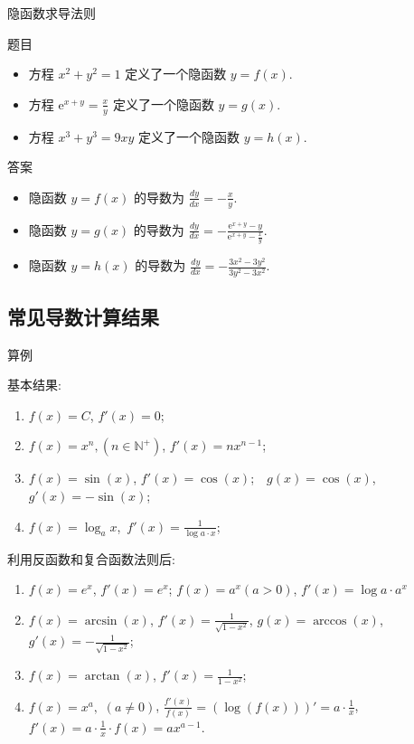 \documentclass[
10pt,
aspectratio=43,
]{beamer}
\begin{document}
\begin{frame}{隐函数求导法则}
	\begin{block}{题目}
		\begin{itemize}
			\item 方程 $x^2 + y^2 = 1$ 定义了一个隐函数 $y = f(x)$.
			\item 方程 $\displaystyle\mathrm{e}^{x+y}=\frac{x}{y}$ 定义了一个隐函数 $y = g(x)$.
			\item 方程 $x^3 + y^3 = 9xy$ 定义了一个隐函数 $y = h(x)$.
		\end{itemize}
	\end{block}

	\pause

	\begin{exampleblock}{答案}
		\begin{itemize}
			\item 隐函数 $y = f(x)$ 的导数为 $\displaystyle\frac{{dy}}{{dx}} = -\frac{{x}}{{y}}.$
			\item 隐函数 $y = g(x)$ 的导数为 $\displaystyle\frac{{dy}}{{dx}} = -\frac{{\mathrm{e}^{x+y}-y}}{{\mathrm{e}^{x+y}-\frac{x}{y}}}.$
			\item 隐函数 $y = h(x)$ 的导数为 $\displaystyle\frac{{dy}}{{dx}} = -\frac{{3x^2 - 3y^2}}{{3y^2 - 3x^2}}.$
		\end{itemize}
	\end{exampleblock}
\end{frame}

\subsection{常见导数计算结果}
\begin{frame}{算例}
	\begin{block}{}
		{\small 基本结果:
			\begin{enumerate}
				\item $f(x)=C$,  $f'(x) =0$;
				\item $f(x)=x^n, (n\in\mathbb{N}^+)$,  $f'(x) = n x^{n-1}$;
				\item $f(x)=\sin(x)$,  $f'(x)=\cos(x)$; \,\, $g(x)=\cos(x)$,  $g'(x)=-\sin(x)$;
				\item $f(x)=\log_a  x$,\, $f'(x)= \displaystyle\frac{1}{\log a \cdot x}$;
			\end{enumerate}
			利用反函数和复合函数法则后:
			\begin{enumerate}
				\item $f(x) = e^x$, $f'(x) = e^x$; $f(x)=a^x(a>0)$, $f'(x)=\log a \cdot a^x$
				\item $f(x) = \arcsin(x)$, $f'(x) = \displaystyle\frac{1}{\sqrt{1-x^2}}$, $g(x) = \arccos(x)$, $g'(x) = \displaystyle-\frac{1}{\sqrt{1-x^2}}$;
				\item $f(x) = \arctan(x)$, $f'(x) = \displaystyle\frac{1}{1-x^2}$;
				\item $f(x) = x^a,\,\,(a\neq0)$, $\displaystyle\frac{f'(x)}{f(x)}=\left(\log(f(x))\right)'=a\cdot \frac 1x$, $\displaystyle f'(x)=a\cdot\frac1x\cdot f(x)=ax^{a-1}$.
			\end{enumerate}
		}
	\end{block}
\end{frame}
\end{document}
